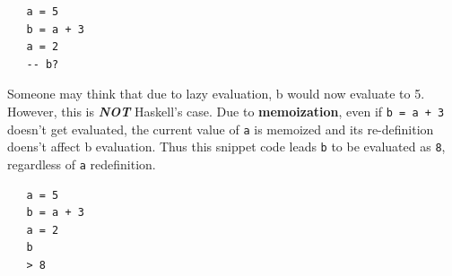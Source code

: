 \begin{lstlisting}
   a = 5
   b = a + 3
   a = 2
   -- b?
\end{lstlisting}
Someone may think that due to lazy evaluation,
b would now evaluate to 5.
However, this is \textit{\textbf{NOT}} Haskell's case.
Due to \textbf{memoization},
even if \lstinline|b = a + 3| doesn't get evaluated,
the current value of \texttt{a} is memoized and its re-definition doens't affect b evaluation.
Thus this snippet code leads \texttt{b} to be evaluated as \texttt{8},
regardless of \texttt{a} redefinition.
\begin{lstlisting}
   a = 5
   b = a + 3
   a = 2
   b
   > 8
\end{lstlisting}
